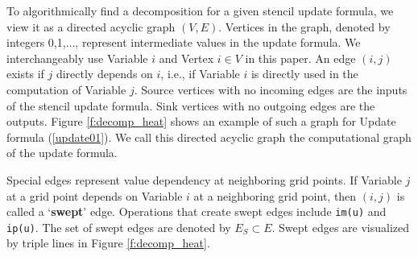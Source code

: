 \documentclass[review]{siamart0216}
\begin{document}
To algorithmically find a decomposition for a given stencil update formula,
we view it as a directed acyclic graph $(V,E)$.
Vertices in the graph, denoted by integers 0,1,$\ldots$,
represent intermediate values in the update formula.
We interchangeably use Variable $i$ and Vertex $i\in V$ in this paper.
An edge $(i,j)$ exists if $j$ directly depends on $i$, i.e., if
Variable $i$ is directly used in the computation of Variable $j$.
Source vertices with no incoming edges are the inputs of the stencil update
formula. Sink vertices with no outgoing edges are the outputs.
Figure \ref{f:decomp_heat} shows an example of such a graph for Update formula
(\ref{update01}).  We call this directed acyclic graph the
computational graph of the update formula.

Special edges represent value dependency at neighboring grid points.
If Variable $j$ at a grid
point depends on Variable $i$ at a neighboring grid point, then
$(i,j)$ is called a `{\bf swept}' edge.  Operations that
create swept edges include \lstinline!im(u)! and \lstinline!ip(u)!.
The set of swept edges are denoted by $E_S \subset E$.  Swept edges are
visualized by triple lines in Figure \ref{f:decomp_heat}.
\end{document}
